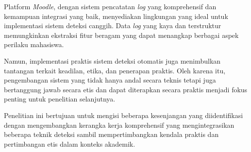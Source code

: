 Platform \textit{Moodle}, dengan sistem pencatatan \textit{log} yang komprehensif dan kemampuan integrasi yang baik, menyediakan lingkungan yang ideal untuk implementasi sistem deteksi canggih. Data \textit{log} yang kaya dan terstruktur memungkinkan ekstraksi fitur beragam yang dapat menangkap berbagai aspek perilaku mahasiswa.

Namun, implementasi praktis sistem deteksi otomatis juga menimbulkan tantangan terkait keadilan, etika, dan penerapan praktis. Oleh karena itu, pengembangan sistem yang tidak hanya andal secara teknis tetapi juga bertanggung jawab secara etis dan dapat diterapkan secara praktis menjadi fokus penting untuk penelitian selanjutnya.

Penelitian ini bertujuan untuk mengisi beberapa kesenjangan yang diidentifikasi dengan mengembangkan kerangka kerja komprehensif yang mengintegrasikan beberapa teknik deteksi sambil mempertimbangkan kendala praktis dan pertimbangan etis dalam konteks akademik.
